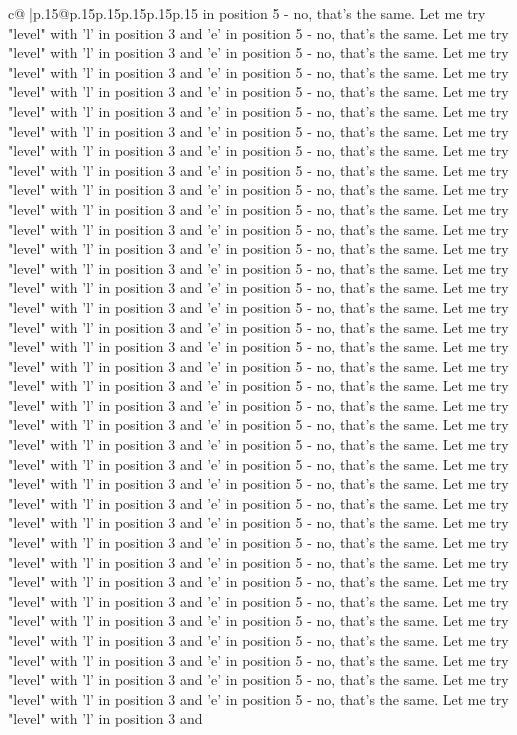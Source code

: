 \documentclass{article}
\begin{document}
{\begin{supertabular}{c@{$\;$}|p{.15\linewidth}@{}p{.15\linewidth}p{.15\linewidth}p{.15\linewidth}p{.15\linewidth}p{.15\linewidth}}
{{{in position 5 {-} no, that's the same. Let me try "level" with 'l' in position 3 and 'e' in position 5 {-} no, that's the same. Let me try "level" with 'l' in position 3 and 'e' in position 5 {-} no, that's the same. Let me try "level" with 'l' in position 3 and 'e' in position 5 {-} no, that's the same. Let me try "level" with 'l' in position 3 and 'e' in position 5 {-} no, that's the same. Let me try "level" with 'l' in position 3 and 'e' in position 5 {-} no, that's the same. Let me try "level" with 'l' in position 3 and 'e' in position 5 {-} no, that's the same. Let me try "level" with 'l' in position 3 and 'e' in position 5 {-} no, that's the same. Let me try "level" with 'l' in position 3 and 'e' in position 5 {-} no, that's the same. Let me try "level" with 'l' in position 3 and 'e' in position 5 {-} no, that's the same. Let me try "level" with 'l' in position 3 and 'e' in position 5 {-} no, that's the same. Let me try "level" with 'l' in position 3 and 'e' in position 5 {-} no, that's the same. Let me try "level" with 'l' in position 3 and 'e' in position 5 {-} no, that's the same. Let me try "level" with 'l' in position 3 and 'e' in position 5 {-} no, that's the same. Let me try "level" with 'l' in position 3 and 'e' in position 5 {-} no, that's the same. Let me try "level" with 'l' in position 3 and 'e' in position 5 {-} no, that's the same. Let me try "level" with 'l' in position 3 and 'e' in position 5 {-} no, that's the same. Let me try "level" with 'l' in position 3 and 'e' in position 5 {-} no, that's the same. Let me try "level" with 'l' in position 3 and 'e' in position 5 {-} no, that's the same. Let me try "level" with 'l' in position 3 and 'e' in position 5 {-} no, that's the same. Let me try "level" with 'l' in position 3 and 'e' in position 5 {-} no, that's the same. Let me try "level" with 'l' in position 3 and 'e' in position 5 {-} no, that's the same. Let me try "level" with 'l' in position 3 and 'e' in position 5 {-} no, that's the same. Let me try "level" with 'l' in position 3 and 'e' in position 5 {-} no, that's the same. Let me try "level" with 'l' in position 3 and 'e' in position 5 {-} no, that's the same. Let me try "level" with 'l' in position 3 and 'e' in position 5 {-} no, that's the same. Let me try "level" with 'l' in position 3 and 'e' in position 5 {-} no, that's the same. Let me try "level" with 'l' in position 3 and 'e' in position 5 {-} no, that's the same. Let me try "level" with 'l' in position 3 and 'e' in position 5 {-} no, that's the same. Let me try "level" with 'l' in position 3 and 'e' in position 5 {-} no, that's the same. Let me try "level" with 'l' in position 3 and 'e' in position 5 {-} no, that's the same. Let me try "level" with 'l' in position 3 and 'e' in position 5 {-} no, that's the same. Let me try "level" with 'l' in position 3 and 'e' in position 5 {-} no, that's the same. Let me try "level" with 'l' in position 3 and 'e' in position 5 {-} no, that's the same. Let me try "level" with 'l' in position 3 and 'e' in position 5 {-} no, that's the same. Let me try "level" with 'l' in position 3 and 'e' in position 5 {-} no, that's the same. Let me try "level" with 'l' in position 3 and }}}
\end{supertabular}}
\end{document}
